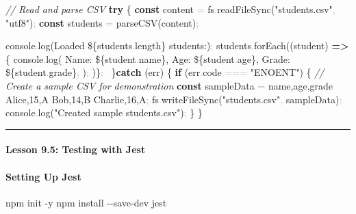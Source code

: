 \documentclass[
  justified,
  openright,
]{tufte-book}
\let\subsection\paragraph
\let\paragraph\paragraph
\newcommand{\KeywordTok}[1]{\textcolor{CodeKeyword}{\textbf{#1}}}  %
\newcommand{\StringTok}[1]{\textcolor{CodeString}{#1}}              %
\newcommand{\CommentTok}[1]{\textcolor{CodeComment}{\textit{#1}}}  %
\newcommand{\CodeFuncTok}[1]{\textcolor{CodeKeyword}{#1}}           %
\newcommand{\CodeTypeTok}[1]{\textcolor{CodeType}{#1}}              %
\newcommand{\OperatorTok}[1]{\textcolor{DarkGray}{#1}}              %
\newenvironment{Shaded}{%
  \begin{mdframed}[style=TufteCode]%
}{%
  \end{mdframed}%
}
\let\subsection\paragraph
\let\paragraph\paragraph
\begin{document}
\begin{Shaded}
\begin{Highlighting}[]
\CommentTok{// Read and parse CSV}
\KeywordTok{try} \{
  \KeywordTok{const} content \OperatorTok{=} fs\OperatorTok{.}\CodeFuncTok{readFileSync}(\StringTok{"students.csv"}\OperatorTok{,} \StringTok{"utf8"})\OperatorTok{;}
  \KeywordTok{const} students \OperatorTok{=} \CodeFuncTok{parseCSV}(content)\OperatorTok{;}
 
  console\OperatorTok{.}\CodeFuncTok{log}(\StringTok{\textasciigrave{}Loaded }\StringTok{\$\{}students\OperatorTok{.}\CodeTypeTok{length}\StringTok{\}}\StringTok{ students:\textasciigrave{}})\OperatorTok{;}
  students\OperatorTok{.}\CodeFuncTok{forEach}((student) \KeywordTok{=\textgreater{}} \{
    console\OperatorTok{.}\CodeFuncTok{log}(
      \StringTok{\textasciigrave{}  Name: }\StringTok{\$\{}student\OperatorTok{.}\CodeTypeTok{name}\StringTok{\}}\StringTok{, Age: }\StringTok{\$\{}student\OperatorTok{.}\CodeTypeTok{age}\StringTok{\}}\StringTok{, Grade: }\StringTok{\$\{}student\OperatorTok{.}\CodeTypeTok{grade}\StringTok{\}}\StringTok{\textasciigrave{}}\OperatorTok{,}
    )\OperatorTok{;}
  )\}\OperatorTok{;}
\ \}\KeywordTok{catch} (err) \{
  \KeywordTok{if} (err\OperatorTok{.}\CodeTypeTok{code} \OperatorTok{===} \StringTok{"ENOENT"}) \{
    \CommentTok{// Create a sample CSV for demonstration}
    \KeywordTok{const} sampleData \OperatorTok{=} \StringTok{\textasciigrave{}name,age,grade}
\StringTok{Alice,15,A}
\StringTok{Bob,14,B}
\StringTok{Charlie,16,A\textasciigrave{}}\OperatorTok{;}
    fs\OperatorTok{.}\CodeFuncTok{writeFileSync}(\StringTok{"students.csv"}\OperatorTok{,} sampleData)\OperatorTok{;}
    console\OperatorTok{.}\CodeFuncTok{log}(\StringTok{"Created sample students.csv"})\OperatorTok{;}
  \}
\}
\end{Highlighting}
\end{Shaded}

\begin{center}\rule{0.5\linewidth}{0.5pt}\end{center}

\subsection{Lesson 9.5: Testing with
Jest}\label{lesson-9.5-testing-with-jest}

\subsection{Setting Up Jest}\label{setting-up-jest}

\begin{Shaded}
\begin{Highlighting}[]
npm init \CodeTypeTok{{-}y}
npm install \CodeTypeTok{{-}{-}save{-}dev} jest
\end{Highlighting}
\end{Shaded}
\end{document}
